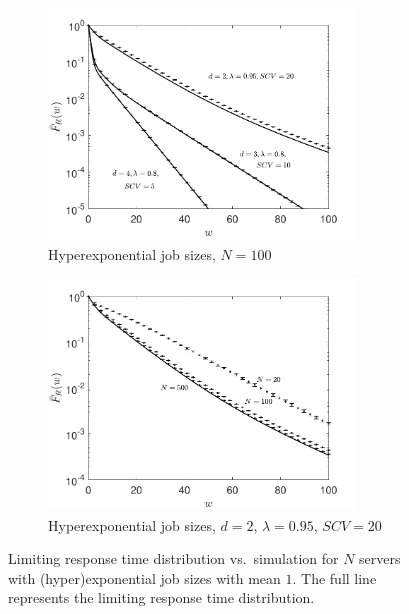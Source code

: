 \documentclass[12pt]{report}
\begin{document}
\begin{figure}[t]
\begin{center}
\begin{subfigure}{.45\textwidth}
\includegraphics[width=0.9\textwidth]{figures/Chapter2/fig3_6c.pdf}
\caption{Hyperexponential job sizes, $N = 100$}
\label{fig:validateHEXP_LLd}
\end{subfigure}
\begin{subfigure}{.45\textwidth}
\centering
\includegraphics[width=0.9\textwidth]{figures/Chapter2/fig3_6d.pdf}
\caption{Hyperexponential job sizes, $d = 2$, $\lambda = 0.95$, $SCV = 20$}
\label{fig:validateHEXP2_LLd}
\end{subfigure}
\caption{Limiting response time distribution vs.~simulation 
for $N$ servers with (hyper)exponential job sizes with mean $1$.
The full line represents the limiting response time distribution.}
\end{center}
\end{figure}
\end{document}
